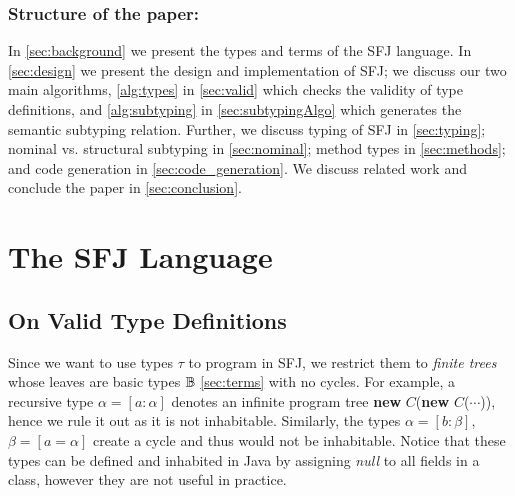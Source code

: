 \documentclass[runningheads]{llncs}
\begin{document}

\subsubsection{Structure of the paper:}
In \autoref{sec:background} we present the types and terms of the SFJ language.
In \autoref{sec:design} we present the design and implementation of SFJ; we discuss our two main algorithms, \autoref{alg:types} in \autoref{sec:valid} which checks the validity of type definitions, and \autoref{alg:subtyping} in \autoref{sec:subtypingAlgo} which generates the semantic subtyping relation.
Further, we discuss typing of SFJ in \autoref{sec:typing}; nominal vs. structural subtyping in \autoref{sec:nominal}; method types in \autoref{sec:methods}; and code generation in \autoref{sec:code_generation}.
We discuss related work and conclude the paper in \autoref{sec:conclusion}.



\section{The SFJ Language}
\label{sec:design}
\subsection{On Valid Type Definitions}
\label{sec:valid}
Since we want to use types $\tau$ to program in SFJ, we restrict them to \emph{finite trees} whose leaves are basic types ${\mathbb B}$ \autoref{sec:terms} with no cycles.
For example, a recursive type $\alpha = [a : \alpha]$ denotes an infinite program tree \textbf{new} $C$(\textbf{new} $C$($\cdots{}$)), hence we rule it out as it is not inhabitable.
Similarly, the types $\alpha = [b: \beta]$, $\beta = [a = \alpha]$ create a cycle and thus would not be inhabitable.
Notice that these types can be defined and inhabited in Java by assigning \emph{null} to all fields in a class, however they are not useful in practice.
\end{document}
